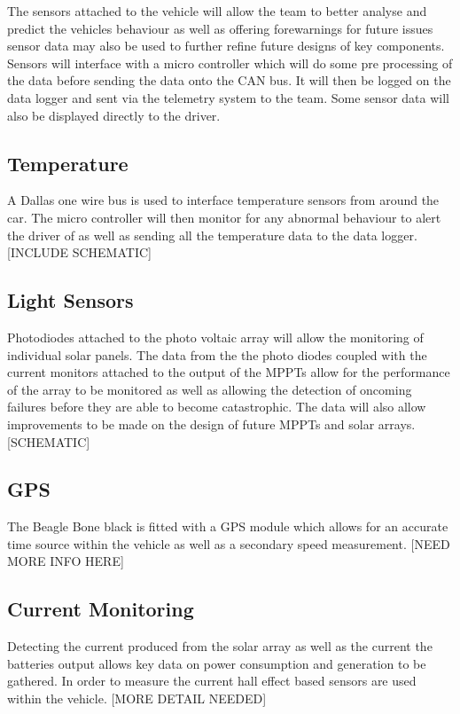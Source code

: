 The sensors attached to the vehicle will allow the team to better analyse and predict the vehicles behaviour as well as offering forewarnings for future issues sensor data may also be used to further refine future designs of key components. Sensors will interface with a micro controller which will do some pre processing of the data before sending the data onto the CAN bus. It will then be logged on the data logger and sent via the telemetry system to the team. Some sensor data will also be displayed directly to the driver. 

\subsection{Temperature}
A Dallas one wire bus is used to interface temperature sensors from around the car. The micro controller will then monitor for any abnormal behaviour to alert the driver of as well as sending all the temperature data to the data logger. [INCLUDE SCHEMATIC]

\subsection{Light Sensors}
Photodiodes attached to the photo voltaic array will allow the monitoring of individual solar panels. The data from the the photo diodes coupled with the current monitors attached to the output of the MPPTs allow for the performance of the array to be monitored as well as allowing the detection of oncoming failures before they are able to become catastrophic. The data will also allow improvements to be made on the design of future MPPTs and solar arrays. [SCHEMATIC] 

\subsection{GPS}
The Beagle Bone black is fitted with a GPS module which allows for an accurate time source within the vehicle as well as a secondary speed measurement. [NEED MORE INFO HERE]

\subsection{Current Monitoring}
Detecting the current produced from the solar array as well as the current the batteries output allows key data on power consumption and generation to be gathered. In order to measure the current hall effect based sensors are used within the vehicle. [MORE DETAIL NEEDED]

